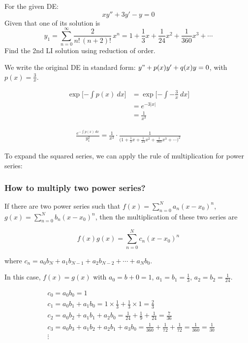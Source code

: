 \begin{example}
    For the given DE:
    \[
        xy'' + 3y' - y = 0
    \]
    Given that one of its solution is 
    \[
        y_1 = \sum_{n=0}^{\infty} \frac{2}{n!\, (n+2)!}\, x^n = 1 + \frac{1}{3}x + \frac{1}{24}x^2 + \frac{1}{360}x^3 + \cdots
    \]
    Find the 2nd LI solution using reduction of order.
\end{example}
\begin{solution}
    We write the original DE in standard form: $y" + p(x)y' + q(x)y = 0$, with $\displaystyle p(x) = \frac{3}{x}$.

    \begin{align*}
        \exp\big[{-\int p(x) \>dx}\big] &= \exp \big[{-\int -\frac{3}{x} \>dx}\big]\\
        &= e^{-3 |x|}\\
        &= \frac{1}{x^3}
    \end{align*}

    \begin{align*}
        \frac{e^{-\int p(x) \> dx}}{y_1^2} 
        = \frac{1}{x^3} \cdot \frac{1}{\biggl(1 + \frac{1}{3}x + \frac{1}{24}x^2 + \frac{1}{360}x^3 + \cdots\biggr)^2} \label{eq:1} \tag{a}
    \end{align*}

    To expand the squared series, we can apply the rule of multiplication for power series:

    \begin{mdframed}
        \subsubsection*{How to multiply two power series?}

        If there are two power series such that $f(x) = \sum_{n=0}^{N}a_n (x-x_0)^n$, $g(x) = \sum_{n=0}^{N}b_n (x-x_0)^n$, then 
        the multiplication of these two series are 

        \[
            f(x)g(x) = \sum_{n=0}^{N} c_n (x-x_0)^n
        \]

        where $c_n = a_0b_N + a_1b_{N-1} + a_2b_{N-2} + \cdots + a_Nb_0$.
    \end{mdframed}
    

    In this case, $f(x) = g(x)$ with $a_0 = b+0 = 1$, $a_1 = b_1 = \frac{1}{3}$, $a_2 = b_2 = \frac{1}{24}$. 

    \begin{align*}
        &c_0 = a_0b_0 = 1\\
        &c_1 = a_0b_1 + a_1b_0 = 1 \times \frac{1}{3} + \frac{1}{3} \times 1 = \frac{2}{3}\\
        &c_2 = a_0b_2 + a_1b_1 + a_2b_0 = \frac{1}{24} + \frac{1}{9} + \frac{1}{24} = \frac{7}{36}\\
        &c_3 = a_0b_3 + a_1b_2 + a_2b_1 + a_3b_0 = \frac{1}{360} + \frac{1}{72} + \frac{1}{72} = \frac{1}{360}
        = \frac{1}{30}\\
        &\vdots
    \end{align*}


\end{solution}
